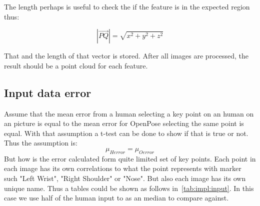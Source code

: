The length perhaps is useful to check the if the feature is in the expected region thus:

\begin{equation}
    |\overrightarrow{PQ}| = \sqrt{x^2 + y^2 + z^2}
\end{equation}

That and the length of that vector is stored.
After all images are processed, the result should be a point cloud for each feature.

\subsection{Input data error}\label{sub:implment:inputerror}
Assume that the mean error from a human selecting a key point on an human on an picture is equal to the mean error for OpenPose selecting the same point is equal.
With that assumption a t-test can be done to show if that is true or not.
Thus the assumption is:
\[
    \mu_{Herror} = \mu_{Oerror}
\]
But how is the error calculated form quite limited set of key points.
Each point in each image has its own correlations to what the point represents with marker such "Left Wrist", "Right Shoulder" or "Nose".
But also each image has its own unique name.
Thus a tables could be shown as follows in~\ref{tab:impl:input}.
In this case we use half of the human input to as an median to compare against.
